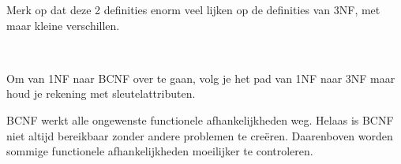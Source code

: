 \noindent Merk op dat deze 2 definities enorm veel lijken op de definities van 3NF, met maar kleine verschillen.

~

\noindent Om van 1NF naar BCNF over te gaan, volg je het pad van 1NF naar 3NF maar houd je rekening met sleutelattributen.

BCNF werkt alle ongewenste functionele afhankelijkheden weg. Helaas is BCNF niet altijd bereikbaar zonder andere problemen te cre\"eren. Daarenboven worden sommige functionele afhankelijkheden moeilijker te controleren.